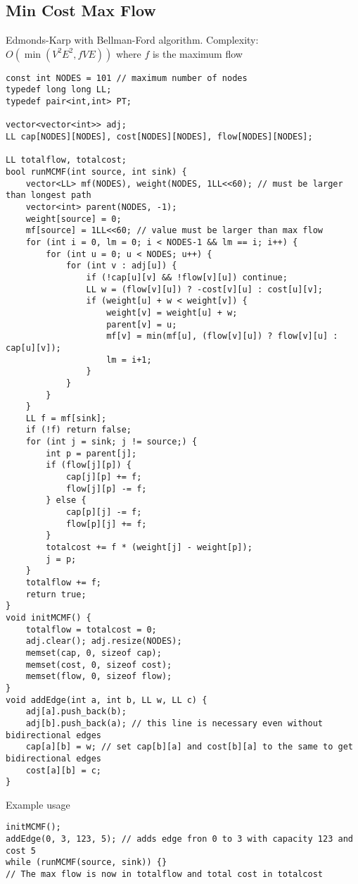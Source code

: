 \documentclass[letterpaper]{article}
\begin{document}
\clearpage

\subsection{Min Cost Max Flow}

Edmonds-Karp with Bellman-Ford algorithm. Complexity: $O\left(\min\left(V^2E^2, fVE\right)\right)$ where $f$ is the maximum flow

\begin{lstlisting}
const int NODES = 101 // maximum number of nodes
typedef long long LL;
typedef pair<int,int> PT;

vector<vector<int>> adj;
LL cap[NODES][NODES], cost[NODES][NODES], flow[NODES][NODES];

LL totalflow, totalcost;
bool runMCMF(int source, int sink) {
	vector<LL> mf(NODES), weight(NODES, 1LL<<60); // must be larger than longest path
	vector<int> parent(NODES, -1);
	weight[source] = 0;
	mf[source] = 1LL<<60; // value must be larger than max flow
	for (int i = 0, lm = 0; i < NODES-1 && lm == i; i++) {
		for (int u = 0; u < NODES; u++) {
			for (int v : adj[u]) {
				if (!cap[u][v] && !flow[v][u]) continue;
				LL w = (flow[v][u]) ? -cost[v][u] : cost[u][v];
				if (weight[u] + w < weight[v]) {
					weight[v] = weight[u] + w;
					parent[v] = u;
					mf[v] = min(mf[u], (flow[v][u]) ? flow[v][u] : cap[u][v]);
					lm = i+1;
				}
			}
		}
	}
	LL f = mf[sink];
	if (!f) return false;
	for (int j = sink; j != source;) {
		int p = parent[j];
		if (flow[j][p]) {
			cap[j][p] += f;
			flow[j][p] -= f;
		} else {
			cap[p][j] -= f;
			flow[p][j] += f;
		}
		totalcost += f * (weight[j] - weight[p]);
		j = p;
	}
	totalflow += f;
	return true;
}
void initMCMF() {
	totalflow = totalcost = 0;
	adj.clear(); adj.resize(NODES);
	memset(cap, 0, sizeof cap);
	memset(cost, 0, sizeof cost);
	memset(flow, 0, sizeof flow);
}
void addEdge(int a, int b, LL w, LL c) {
	adj[a].push_back(b);
	adj[b].push_back(a); // this line is necessary even without bidirectional edges
	cap[a][b] = w; // set cap[b][a] and cost[b][a] to the same to get bidirectional edges
	cost[a][b] = c;
}
\end{lstlisting}
Example usage
\begin{lstlisting}
initMCMF();
addEdge(0, 3, 123, 5); // adds edge fron 0 to 3 with capacity 123 and cost 5
while (runMCMF(source, sink)) {}
// The max flow is now in totalflow and total cost in totalcost
\end{lstlisting}

\clearpage
\end{document}
